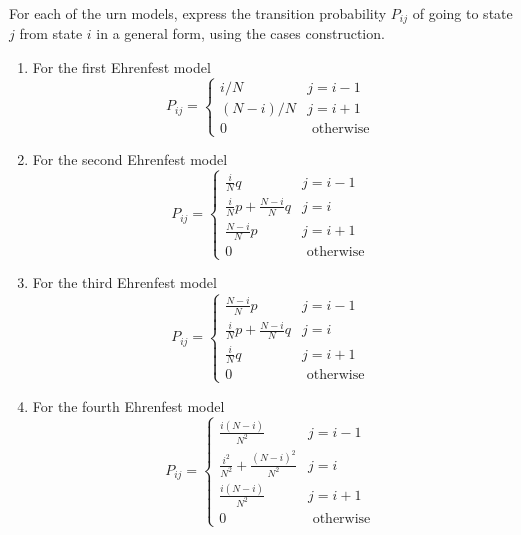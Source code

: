 \documentclass[12pt]{article}
\begin{document}
\begin{exercise}
    For each of the urn models, express the transition probability \( P_
    {ij} \) of going to state \( j \) from state \( i \) in a general
    form, using the cases construction.
\end{exercise}
\begin{solution}
    \begin{enumerate}[label=(\alph*)]
    \item
        For the first Ehrenfest model
        \[
            P_{ij} =
            \begin{cases}
                i/N & j = i-1 \\
                (N-i)/N & j = i+1 \\
                0 & \text{ otherwise }
            \end{cases}
        \]
    \item
        For the second Ehrenfest model
        \[
            P_{ij} =
            \begin{cases}
                \frac{i}{N} q & j = i-1 \\
                \frac{i}{N} p + \frac{N-i}{N} q & j = i \\
                \frac{N-i}{N} p & j = i+1 \\
                0 & \text{ otherwise }
            \end{cases}
        \]
    \item
        For the third Ehrenfest model
        \[
            P_{ij} =
            \begin{cases}
                \frac{N-i}{N} p & j = i-1 \\
                \frac{i}{N} p + \frac{N-i}{N} q & j = i \\
                \frac{i}{N} q & j = i+1 \\
                0 & \text{ otherwise }
            \end{cases}
        \]
    \item
        For the fourth Ehrenfest model
        \[
            P_{ij} =
            \begin{cases}
                \frac{i(N-i)}{N^2} & j = i-1 \\
                \frac{i^2}{N^2} + \frac{(N-i)^2}{N^2} & j = i \\
                \frac{i(N-i)}{N^2} & j = i+1 \\
                0 & \text{ otherwise }
            \end{cases}
        \]
\end{enumerate}
\end{solution}
\end{document}
